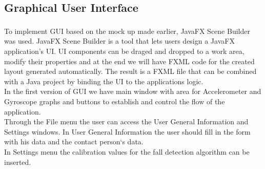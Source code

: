 \documentclass[hidelinks,conference,12pt]{IEEETran}
\begin{document}
\subsection{Graphical User Interface} 
To implement GUI based on the mock up made earlier, JavaFX Scene Builder\textsuperscript{\cite{JavaFX}} was used. JavaFX Scene Builder is a tool that lets users design a JavaFX application’s UI. UI components can be
draged and dropped to a work area, modify their properties and at the end we will have FXML code
for the created layout generated automatically. The result is a FXML file that can be combined with a Java project by binding the UI to the applications logic.\\
In the first version of GUI we have main window with area for Accelerometer and Gyroscope graphs
and buttons to establish and control the flow of the application.\\
Through the File menu the user can access the User General Information and Settings windows.
In User General Information the user should fill in the form with his data and the contact person‘s data.\\
In Settings menu the calibration values for the fall detection algorithm can be inserted.
\end{document}
